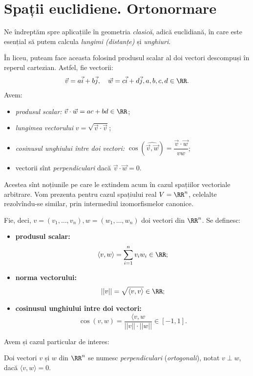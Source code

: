 \chapter{Spații euclidiene. Ortonormare}

Ne îndreptăm spre aplicațiile în geometria \emph{clasică}, adică
euclidiană, în care este esențial să putem calcula \emph{lungimi (distanțe)}
și \emph{unghiuri}.

În liceu, puteam face aceasta folosind produsul scalar al doi vectori
descompuși în reperul cartezian. Astfel, fie vectorii:
\[
  \vec{v} = a \vec{i} + b \vec{j}, \quad \vec{w} = c \vec{i} + d \vec{j}, %
  a, b, c, d \in \RR.
\]
Avem:
\begin{itemize}
\item \emph{produsul scalar:} $ \vec{v} \cdot \vec{w} = ac + bd \in \RR $;
\item \emph{lungimea vectorului} $ v = \sqrt{\vec{v} \cdot \vec{v}} $;
\item \emph{cosinusul unghiului între doi vectori:} %
  $ \cos(\widehat{\vec{v}, \vec{w}}) = \dfrac{\vec{v} \cdot \vec{w}}{v w} $;
\item vectorii sînt \emph{perpendiculari} dacă $ \vec{v} \cdot \vec{w} = 0 $.
\end{itemize}

Acestea sînt noțiunile pe care le extindem acum în cazul spațiilor vectoriale
arbitrare. Vom prezenta pentru cazul spațiului real $ V = \RR^n $, celelalte
rezolvîndu-se similar, prin intermediul izomorfismelor canonice.

Fie, deci, $ v = (v_1, \dots, v_n), w = (w_1, \dots, w_n) $ doi vectori
din $ \RR^n $. Se definesc:
\begin{itemize}  
\item \textbf{produsul scalar:}
  \[
    \langle v, w \rangle = \sum_{i = 1}^n v_i w_i \in \RR;
  \]
\item \textbf{norma vectorului:}
  \[
    || v || = \sqrt{\langle v, v \rangle} \in \RR;
  \]
\item \textbf{cosinusul unghiului între doi vectori:}
  \[
    \cos(v, w) = \frac{\langle v, w}{||v|| \cdot ||w||} \in [-1, 1].
  \]
\end{itemize}

Avem și cazul particular de interes:
\begin{definition}\label{def:perp}
  Doi vectori $ v $ și $ w $ din $ \RR^n $ se numesc \emph{perpendiculari}
  (\emph{ortogonali}), notat $ v \perp w $, dacă $ \langle v, w \rangle = 0 $.
\end{definition}

